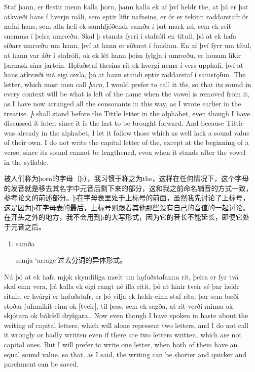 \begin{paracol}{2}
  Staf þann, er flestir menn kalla þorn, þann kalla ek af því heldr the, at þá er þat atkvæði hans í hverju máli, sem eptir lifir nafnsins, er ór er tekinn raddarstafr ór nafni hans, sem alla hefi ek samhljóðendr samða í þat mark nú, sem ek reit snemma í þeira umrœðu. Skal þ standa fyrri í stafrófi en títull, þó at ek hafa síðarr umrœðu um hann, því at hann er síðarst í fundinn. En af því fyrr um títul, at hann var áðr í stafrófi, ok ek lét hann þeim fylgja í umrœðu, er honum líkir þarnask sína jartein. Hǫfuðstaf thesins rít ek hvergi nema í vers upphafi, því at hans atkvæði má eigi œxla, þó at hann standi eptir raddarstaf í samstǫfun.
  \switchcolumn
  The letter, which most men call \textit{þorn}, I would prefer to call it \textit{the}, so that its sound in every context will be what is left of the name when the vowel is removed from it, as I have now arranged all the consonants in this way, as I wrote earlier in the treatise. \textit{þ} shall stand before the Tittle letter in the alphabet, even though I have discussed it later, since it is the last to be brought forward. And because Tittle was already in the alphabet, I let it follow those which as well lack a sound value of their own. I do not write the capital letter of the, except at the beginning of a verse, since its sound cannot be lengthened, even when it stands after the vowel in the syllable.
\end{paracol}
\begin{translation*}{}
  被人们称为þorn的字母（þ），我习惯于称之为the，这样在任何情况下，这个字母的发音就是移去其名字中元音后剩下来的部分，这和我之前命名辅音的方式一致，参考论文的前述部分。þ在字母表里处于上标号的前面，虽然我先讨论了上标号，这是因为þ在字母表的最后，上标号则跟着其他那些没有自己的音值的一起讨论。在开头之外的地方，我不会用到þ的大写形式，因为它的音长不能延长，即便它处于元音之后。
\end{translation*}
\begin{grammar*}{}
  \begin{enumerate}[leftmargin=*]
    \item samða

          semja `arrage'过去分词的异体形式。
  \end{enumerate}
\end{grammar*}
\begin{paracol}{2}
  Nú þó at ek hafa mjǫk skyndiliga mælt um hǫfuðstafanna rit, þeira er fyr tvá skal einn vera, þá kalla ek eigi rangt né illa ritit, þó at hinir tveir sé þar heldr ritnir, er hvárgi er hǫfuðstafr, er þó vilja ek heldr einn staf ríta, þar sem bæði stoðar jafnmikit einn ok [tveir], til þess, sem ek sagða, at rit verði minna ok skjótara ok bókfell drjúgara..
  \switchcolumn
  Now even though I have spoken in haste about the writing of capital letters, which will alone represent two letters, and I do not call it wrongly or badly written even if there are two letters written, which are not capital ones. But I will prefer to write one letter, when both of them have an equal sound value, so that, as I said, the writing can be shorter and quicker and parchment can be saved.
\end{paracol}
